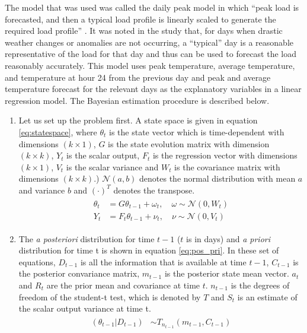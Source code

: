 \documentclass[a4paper]{article}
\begin{document}
The model that was used was called the daily peak model in which ``peak load is forecasted, and then a typical load profile is linearly scaled to generate the required load profile'' \citep{douglas98}. It was noted in the study that, for days when drastic weather changes or anomalies are not occurring, a ``typical'' day is a reasonable representative of the load for that day and thus can be used to forecast the load reasonably accurately. This model uses peak temperature, average temperature, and temperature at hour 24 from the previous day and peak and average temperature forecast for the relevant days as the explanatory variables in a linear regression model. The Bayesian estimation procedure is described below.
\begin{enumerate}
\item Let us set up the problem first. A state space is given in equation \ref{eq:statespace}, where $\theta_t$ is the state vector which is time-dependent with dimensions $(k \times 1)$, $G$ is the state evolution matrix with dimension $(k \times k)$, $Y_t$ is the scalar output, $F_t$ is the regression vector with dimensions $(k \times 1)$, $V_t$ is the scalar variance and $W_t$ is the covariance matrix with dimensions $(k \times k)$.) $\mathscr{N}(a,b)$ denotes the normal distribution with mean $a$ and variance $b$ and $(\cdot)^T$ denotes the transpose.
\begin{align} \label{eq:statespace}
\begin{split}
\theta_t &= G\theta_{t-1} + \omega_t, \quad \omega \sim \mathscr{N}(0,W_t) \\
Y_t &= F_t\theta_{t-1} + \nu_t, \quad \nu \sim \mathscr{N}(0,V_t)
\end{split}
\end{align}
%
\item The \textit{a posteriori} distribution for time $t-1$ ($t$ is in days) and \textit{a priori} distribution for time t is shown in equation \ref{eq:pos_pri}. In these set of equations, $D_{t-1}$ is all the information that is available at time $t-1$, $C_{t-1}$ is the posterior convariance matrix, $m_{t-1}$ is the posterior state mean vector. $a_t$ and $R_t$ are the prior mean and covariance at time $t$. $n_{t-1}$ is the degrees of freedom of the student-t test, which is denoted by $T$ and $S_t$ is an estimate of the scalar output variance at time t.
%
\begin{align} \label{eq:pos_pri}
\begin{split}
(\theta_{t-1}|D_{t-1}) &\sim T_{n_{t-1}}(m_{t-1},C_{t-1}) \\

\end{split}
\end{align}
\end{enumerate}
\end{document}
